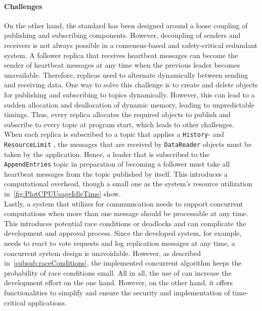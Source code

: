 \paragraph{Challenges}
On the other hand, the  standard has been designed around a loose coupling of publishing and subscribing components.
However, decoupling of senders and receivers is not always possible in a consensus-based and safety-critical redundant system.
A follower replica that receives heartbeat messages can become the sender of heartbeat messages at any time when the previous leader becomes unavailable.
Therefore, replicas need to alternate dynamically between sending and receiving data.
One way to solve this challenge is to create and delete objects for publishing and subscribing to topics dynamically.
However, this can lead to a sudden allocation and deallocation of dynamic memory, leading to unpredictable timings.
Thus, every replica allocates the required objects to publish and subscribe to every topic at program start, which leads to other challenges.
\\

When each replica is subscribed to a topic that applies a \texttt{History}- and \texttt{ResourceLimit} , the messages that are received by \texttt{DataReader} objects must be taken by the application.
Hence, a leader that is subscribed to the \texttt{AppendEntries} topic in preparation of becoming a follower must take all heartbeat messages from the topic published by itself.
This introduces a computational overhead, though a small one as the system's resource utilization in~\autoref{fig:PlotCPUUsageIdleTime} show.
\\

Lastly, a system that utilizes  for communication needs to support concurrent computations when more than one message should be processable at any time.
This introduces potential race conditions or deadlocks and can complicate the development and approval process.
Since the developed system, for example, needs to react to vote requests and log replication messages at any time, a concurrent system design is unavoidable.
However, as described in~\autoref{subsub:raceConditions}, the implemented concurrent algorithm keeps the probability of race conditions small.
All in all, the use of  can increase the development effort on the one hand. However, on the other hand, it offers functionalities to simplify and ensure the security and implementation of time-critical applications.



